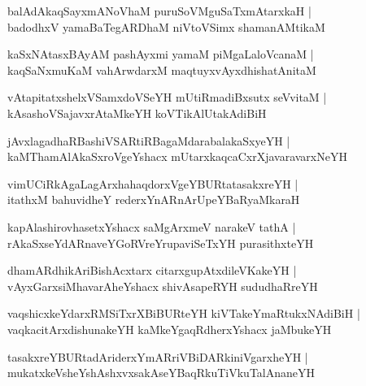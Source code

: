 \documentclass[twoside,12pt,openright]{book}
\newcounter{shloka}[chapter]
\begin{document}
\begin{shloka}%
balAdAkaqSayxmANoVhaM puruSoVMguSaTxmAtarxkaH |\\
badodhxV yamaBaTegARDhaM niVtoVSimx shamanAMtikaM
\end{shloka}

\begin{shloka}%
kaSxNAtasxBAyAM pashAyxmi yamaM piMgaLaloVcanaM |\\
kaqSaNxmuKaM vahArwdarxM maqtuyxvAyxdhishatAnitaM 
\end{shloka}

\begin{shloka}%
vAtapitatxshelxVSamxdoVSeYH mUtiRmadiBxsutx seVvitaM |\\
kAsashoVSajavxrAtaMkeYH koVTikAlUtakAdiBiH 
\end{shloka}

\begin{shloka}%
jAvxlagadhaRBashiVSARtiRBagaMdarabalakaSxyeYH |\\
kaMThamAlAkaSxroVgeYshacx mUtarxkaqcaCxrXjavaravarxNeYH 
\end{shloka}

\begin{shloka}%
vimUCiRkAgaLagArxhahaqdorxVgeYBURtatasakxreYH |\\
itathxM bahuvidheY rederxYnARnArUpeYBaRyaMkaraH
\end{shloka}

\begin{shloka}%
kapAlashirovhasetxYshacx saMgArxmeV narakeV tathA |\\
rAkaSxseYdARnaveYGoRVreYrupaviSeTxYH purasithxteYH
\end{shloka}

\begin{shloka}%
dhamARdhikAriBishAcxtarx citarxgupAtxdileVKakeYH |\\
vAyxGarxsiMhavarAheYshacx shivAsapeRYH sududhaRreYH
\end{shloka}

\begin{shloka}%
vaqshicxkeYdarxRMSiTxrXBiBURteYH kiVTakeYmaRtukxNAdiBiH |\\
vaqkacitArxdishunakeYH kaMkeYgaqRdherxYshacx jaMbukeYH
\end{shloka}

\begin{shloka}%
tasakxreYBURtadAriderxYmARriVBiDARkiniVgarxheYH |\\
mukatxkeVsheYshAshxvxsakAseYBaqRkuTiVkuTalAnaneYH
\end{shloka}
\end{document}
